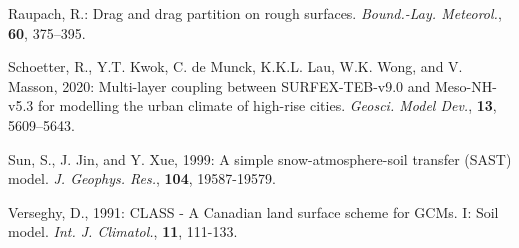 \begin{description}
\item
Raupach, R.:
Drag and drag partition on rough surfaces. 
{\em Bound.-Lay. Meteorol.}, {\bf 60}, 375–395.

\item
Schoetter, R., Y.T. Kwok, C. de Munck, K.K.L. Lau, W.K. Wong, and V. Masson, 2020:
Multi-layer coupling between SURFEX-TEB-v9.0 and Meso-NH-v5.3 for modelling the urban climate of high-rise cities. 
{\em Geosci. Model Dev.}, {\bf 13}, 5609–5643.

\item
Sun, S.,
J. Jin, and Y. Xue, 1999:
A simple snow-atmosphere-soil transfer (SAST) model.
{\em J. Geophys. Res.},
{\bf 104},
19587-19579.

\item
Verseghy, D., 1991:
CLASS - A Canadian land surface scheme for GCMs.
I:  Soil model.
{\em Int. J. Climatol.},
{\bf 11},
111-133.

\end{description}


